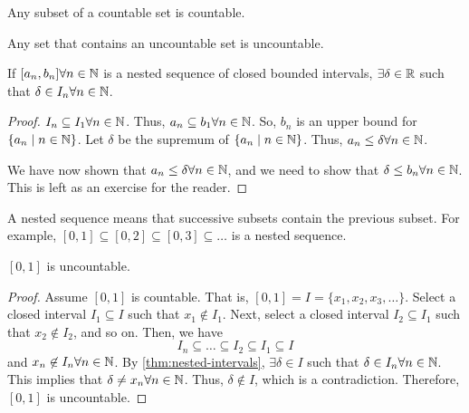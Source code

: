 \begin{theorem}
    Any subset of a countable set is countable.
\end{theorem}
\begin{theorem}
    Any set that contains an uncountable set is uncountable.
\end{theorem}

\begin{theorem}
\label{thm:nested-intervals}
    If $[a_n, b_n] \forall n \in \mathbb{N}$ is a nested sequence of closed bounded intervals, $\exists \delta \in \mathbb{R}$ such that $\delta \in I_n \forall n \in \mathbb{N}$.
\end{theorem}
\begin{proof}
    $I_n \subseteq I_1 \forall n \in \mathbb{N}$. Thus, $a_n \subseteq b_1 \forall n \in \mathbb{N}$. So, $b_n$ is an upper bound for $\{a_n \mid n \in \mathbb{N}\}$. Let $\delta$ be the supremum of $\{a_n \mid n \in \mathbb{N}\}$. Thus, $a_n \leq \delta \forall n \in \mathbb{N}$.

    We have now shown that $a_n \leq \delta \forall n \in \mathbb{N}$, and we need to show that $\delta \leq b_n \forall n \in \mathbb{N}$. This is left as an exercise for the reader.
\end{proof}
\begin{remark}
    A nested sequence means that successive subsets contain the previous subset. For example, $[0, 1] \subseteq [0, 2] \subseteq [0, 3] \subseteq \ldots$ is a nested sequence.
\end{remark}

\begin{theorem}
    $[0, 1]$ is uncountable.
\end{theorem}
\begin{proof}
    Assume $[0, 1]$ is countable. That is, $[0, 1] = I = \{x_1, x_2, x_3, \ldots\}$. Select a closed interval $I_1 \subseteq I$ such that $x_1 \not\in I_1$. Next, select a closed interval $I_2 \subseteq I_1$ such that $x_2 \not\in I_2$, and so on. Then, we have $$ I_n \subseteq \ldots \subseteq I_2 \subseteq I_1 \subseteq I $$ and $x_n \not\in I_n \forall n \in \mathbb{N}$. By \ref{thm:nested-intervals}, $\exists \delta \in I$ such that $\delta \in I_n \forall n \in \mathbb{N}$. This implies that $\delta \neq x_n \forall n \in \mathbb{N}$. Thus, $\delta \not\in I$, which is a contradiction. Therefore, $[0, 1]$ is uncountable.
\end{proof}